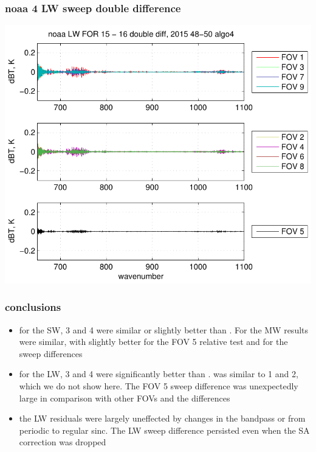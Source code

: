 \documentclass[11pt]{beamer}
\begin{document}
\begin{frame}
\frametitle{noaa 4 LW sweep double difference}
\begin{center}
  \includegraphics[scale=0.7]{figures/noaa_LW_sfil_2015_48-50_algo4.pdf}
\end{center}
\end{frame}
\begin{frame}
\frametitle{conclusions}

\begin{itemize}

  \item for the SW, {\noaa} 3 and 4 were similar or slightly better
    than {\ccast}.  For the MW results were similar, with {\ccast}
    slightly better for the FOV 5 relative test and {\noaa} for the
    sweep differences

  \item for the LW, {\noaa} 3 and 4 were significantly better than
    {\ccast}.  {\ccast} was similar to {\noaa} 1 and 2, which we do
    not show here.  The {\ccast} FOV 5 sweep difference was
    unexpectedly large in comparison with other FOVs and the {\noaa}
    differences

  \item the {\ccast} LW residuals were largely uneffected by changes
    in the bandpass or from periodic to regular sinc.  The LW sweep
    difference persisted even when the SA correction was dropped

\end{itemize}

\end{frame}
\end{document}
